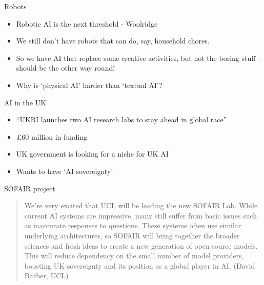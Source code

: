 \documentclass[10pt]{beamer}
\begin{document}
\begin{titledslide}{Robots}

  \begin{itemize}
  \item Robotic AI is the next threshold - Woolridge
  \item We still don't have robots that can do, say, household chores.
  \item So we have AI that replace some creative activities, but not
    the boring stuff - should be the other way round!
  \item Why is `physical AI' harder than `textual AI'?
  \end{itemize}
  
\end{titledslide}
\begin{titledslide}{AI in the UK}

  \begin{itemize}
  \item ``UKRI launches two AI research labs to stay ahead in global
    race''
  \item \pounds 60 million in funding
  \item UK government is looking for a niche for UK AI
  \item Wants to have `AI sovereignty'
  \end{itemize}
\end{titledslide}
\begin{titledslide}{SOFAIR project}
\begin{quote}
    We're very excited that UCL will be leading the new SOFAIR Lab.
    While current AI systems are impressive, many still suffer from
    basic issues such as inaccurate responses to questions. These
    systems often use similar underlying architectures, so SOFAIR will
    bring together the broader sciences and fresh ideas to create a
    new generation of open-source models. This will reduce dependency
    on the small number of model providers, boosting UK sovereignty
    and its position as a global player in AI. (David Barber, UCL)
  \end{quote}
  
\end{titledslide}
\end{document}

